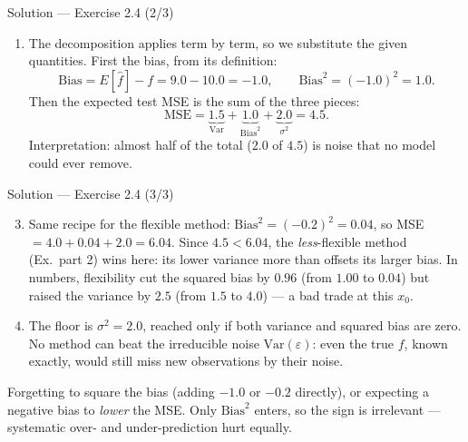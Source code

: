 \documentclass[aspectratio=169,11pt]{beamer}
\begin{document}
\begin{frame}{Solution --- Exercise 2.4 (2/3)}
\begin{solutionbox}
  \begin{enumerate}
  \item The decomposition applies term by term, so we substitute the
        given quantities. First the bias, from its definition:
        \[
          \mathrm{Bias}=E[\hat f]-f=9.0-10.0=-1.0,
          \qquad \mathrm{Bias}^2=(-1.0)^2=1.0.
        \]
        Then the expected test MSE is the sum of the three pieces:
        \[
          \text{MSE}=\underbrace{1.5}_{\text{Var}}
          +\underbrace{1.0}_{\text{Bias}^2}
          +\underbrace{2.0}_{\sigma^2}=4.5.
        \]
        Interpretation: almost half of the total ($2.0$ of $4.5$) is
        noise that no model could ever remove.
\end{enumerate}
\end{solutionbox}
\end{frame}

\begin{frame}{Solution --- Exercise 2.4 (3/3)}
\begin{solutionbox}
\begin{enumerate}\setcounter{enumi}{2}
  \item Same recipe for the flexible method:
        $\mathrm{Bias}^2=(-0.2)^2=0.04$, so
        MSE $=4.0+0.04+2.0=6.04$. Since $4.5<6.04$, the
        \emph{less}-flexible method (Ex.\ part 2) wins here: its lower
        variance more than offsets its larger bias. In numbers,
        flexibility cut the squared bias by $0.96$ (from $1.00$ to
        $0.04$) but raised the variance by $2.5$ (from $1.5$ to
        $4.0$) --- a bad trade at this $x_0$.
  \item The floor is $\sigma^2=2.0$, reached only if both variance and
        squared bias are zero. No method can beat the irreducible
        noise $\mathrm{Var}(\varepsilon)$: even the true $f$, known
        exactly, would still miss new observations by their noise.
\end{enumerate}
\end{solutionbox}
\begin{mistake}
Forgetting to square the bias (adding $-1.0$
or $-0.2$ directly), or expecting a negative bias to \emph{lower} the
MSE. Only $\mathrm{Bias}^2$ enters, so the sign is irrelevant ---
systematic over- and under-prediction hurt equally.
\end{mistake}
\end{frame}
\end{document}
